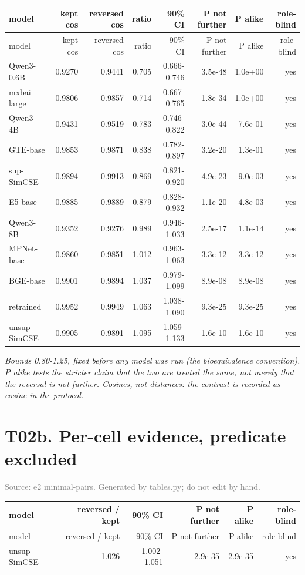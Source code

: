 \documentclass[10pt]{article}
\begin{document}
\footnotesize
\begin{longtable}{lrrrrrrr}
\toprule
model & kept cos & reversed cos & ratio & 90\% CI & P not further & P alike & role-blind \\
\midrule
\endfirsthead
\toprule
model & kept cos & reversed cos & ratio & 90\% CI & P not further & P alike & role-blind \\
\midrule
\endhead
\bottomrule
\endfoot
Qwen3-0.6B & 0.9270 & 0.9441 & 0.705 & 0.666-0.746 & 3.5e-48 & 1.0e+00 & yes \\
mxbai-large & 0.9806 & 0.9857 & 0.714 & 0.667-0.765 & 1.8e-34 & 1.0e+00 & yes \\
Qwen3-4B & 0.9431 & 0.9519 & 0.783 & 0.746-0.822 & 3.0e-44 & 7.6e-01 & yes \\
GTE-base & 0.9853 & 0.9871 & 0.838 & 0.782-0.897 & 3.2e-20 & 1.3e-01 & yes \\
sup-SimCSE & 0.9894 & 0.9913 & 0.869 & 0.821-0.920 & 4.9e-23 & 9.0e-03 & yes \\
E5-base & 0.9885 & 0.9889 & 0.879 & 0.828-0.932 & 1.1e-20 & 4.8e-03 & yes \\
Qwen3-8B & 0.9352 & 0.9276 & 0.989 & 0.946-1.033 & 2.5e-17 & 1.1e-14 & yes \\
MPNet-base & 0.9860 & 0.9851 & 1.012 & 0.963-1.063 & 3.3e-12 & 3.3e-12 & yes \\
BGE-base & 0.9901 & 0.9894 & 1.037 & 0.979-1.099 & 8.9e-08 & 8.9e-08 & yes \\
retrained & 0.9952 & 0.9949 & 1.063 & 1.038-1.090 & 9.3e-25 & 9.3e-25 & yes \\
unsup-SimCSE & 0.9905 & 0.9891 & 1.095 & 1.059-1.133 & 1.6e-10 & 1.6e-10 & yes \\
\end{longtable}
\normalsize

\textit{Bounds 0.80-1.25, fixed before any model was run (the bioequivalence convention). P alike tests the stricter claim that the two are treated the same, not merely that the reversal is not further. Cosines, not distances: the contrast is recorded as cosine in the protocol.}
\clearpage

\section*{T02b. Per-cell evidence, predicate excluded}
\textcolor{gray}{Source: e2 minimal-pairs. Generated by tables.py; do not edit by hand.}

\footnotesize
\begin{longtable}{lrrrrr}
\toprule
model & reversed / kept & 90\% CI & P not further & P alike & role-blind \\
\midrule
\endfirsthead
\toprule
model & reversed / kept & 90\% CI & P not further & P alike & role-blind \\
\midrule
\endhead
\bottomrule
\endfoot
unsup-SimCSE & 1.026 & 1.002-1.051 & 2.9e-35 & 2.9e-35 & yes \\
\end{longtable}
\normalsize
\end{document}
